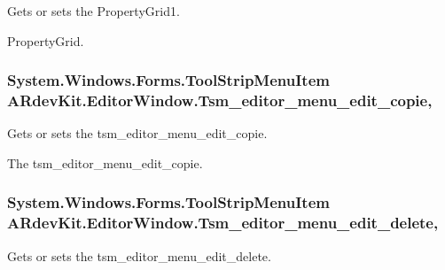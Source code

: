 Gets or sets the Property\-Grid1. 

Property\-Grid. \hypertarget{class_a_rdev_kit_1_1_editor_window_a7ce809e15aaf06e0d514989fb6292687}{
\subsubsection[{Tsm\-\_\-editor\-\_\-menu\-\_\-edit\-\_\-copie}]{\setlength{\rightskip}{0pt plus 5cm}System.\-Windows.\-Forms.\-Tool\-Strip\-Menu\-Item A\-Rdev\-Kit.\-Editor\-Window.\-Tsm\-\_\-editor\-\_\-menu\-\_\-edit\-\_\-copie\hspace{0.3cm}{\ttfamily [get]}, {\ttfamily [set]}}}\label{class_a_rdev_kit_1_1_editor_window_a7ce809e15aaf06e0d514989fb6292687}


Gets or sets the tsm\-\_\-editor\-\_\-menu\-\_\-edit\-\_\-copie. 

The tsm\-\_\-editor\-\_\-menu\-\_\-edit\-\_\-copie. \hypertarget{class_a_rdev_kit_1_1_editor_window_a94b80b86878dae463d966bd117732260}{
\subsubsection[{Tsm\-\_\-editor\-\_\-menu\-\_\-edit\-\_\-delete}]{\setlength{\rightskip}{0pt plus 5cm}System.\-Windows.\-Forms.\-Tool\-Strip\-Menu\-Item A\-Rdev\-Kit.\-Editor\-Window.\-Tsm\-\_\-editor\-\_\-menu\-\_\-edit\-\_\-delete\hspace{0.3cm}{\ttfamily [get]}, {\ttfamily [set]}}}\label{class_a_rdev_kit_1_1_editor_window_a94b80b86878dae463d966bd117732260}


Gets or sets the tsm\-\_\-editor\-\_\-menu\-\_\-edit\-\_\-delete. 

